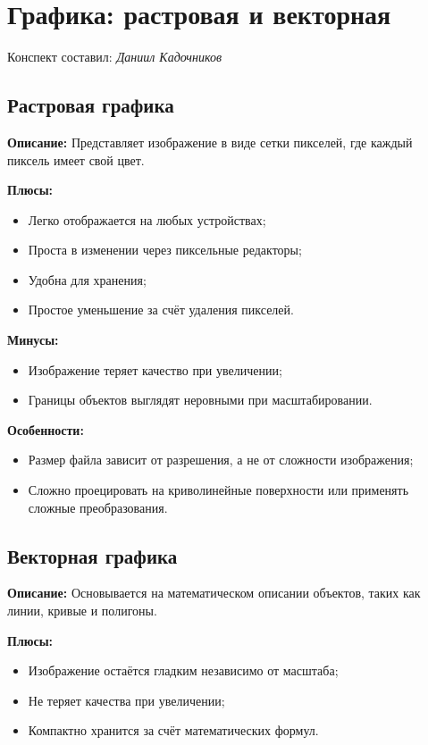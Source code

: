 \section{Графика: растровая и векторная}
\begin{center}
    Конспект составил: \textit{Даниил Кадочников}
\end{center}

\subsection{Растровая графика}
\textbf{Описание:}
Представляет изображение в виде сетки пикселей, где каждый пиксель имеет свой цвет.

\textbf{Плюсы:}
\begin{itemize}
    \item Легко отображается на любых устройствах;
    \item Проста в изменении через пиксельные редакторы;
    \item Удобна для хранения;
    \item Простое уменьшение за счёт удаления пикселей.
\end{itemize}

\textbf{Минусы:}
\begin{itemize}
    \item Изображение теряет качество при увеличении;
    \item Границы объектов выглядят неровными при масштабировании.
\end{itemize}

\textbf{Особенности:}
\begin{itemize}
    \item Размер файла зависит от разрешения, а не от сложности изображения;
    \item Сложно проецировать на криволинейные поверхности или применять сложные преобразования.
\end{itemize}

\subsection{Векторная графика}
\textbf{Описание:}
Основывается на математическом описании объектов, таких как линии, кривые и полигоны.

\textbf{Плюсы:}
\begin{itemize}
    \item Изображение остаётся гладким независимо от масштаба;
    \item Не теряет качества при увеличении;
    \item Компактно хранится за счёт математических формул.
\end{itemize}


